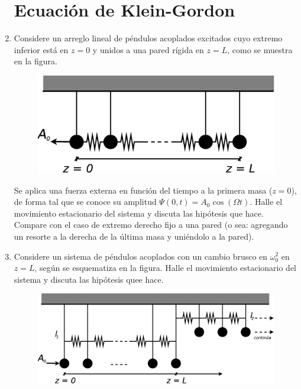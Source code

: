 \documentclass[11pt,spanish]{article}
\begin{document}
\begin{enumerate}
\section*{Ecuación de Klein-Gordon}


    \item Considere un arreglo lineal de péndulos acoplados excitados cuyo
    extremo inferior está en $z=0$ y unidos a una pared rígida en $z=L$, como
    se muestra en la figura.

    \begin{figure}[H]
        \centering{}\includegraphics[clip,scale=0.25]{figs/ej1-15}
    \end{figure}

    Se aplica una fuerza externa en función del tiempo a la primera masa
    ($z=0$), de forma tal que se conoce su amplitud
    $\Psi(0,t)=A_{0}\cos(\Omega t)$. Halle el movimiento estacionario del
    sistema y discuta las hipótesis que hace. Compare con el caso de extremo
    derecho fijo a una pared (o sea: agregando un resorte a la derecha de la
    última masa y uniéndolo a la pared).


    \item Considere un sistema de péndulos acoplados con un cambio brusco en
    $\omega_{0}^{2}$ en $z=L$, según se esquematiza en la figura. Halle el
    movimiento estacionario del sistema y discuta las hipótesis quee hace.

    \begin{figure}[H]
        \centering{}\includegraphics[clip,scale=0.25]{figs/ej1-16}
    \end{figure}


\end{enumerate}
\end{document}
